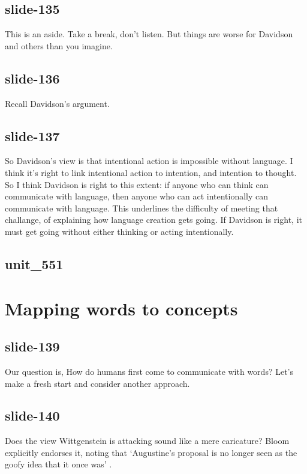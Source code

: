 \documentclass[12pt,\papersize]{extarticle}
\begin{document}
 
\subsection{slide-135}
This is an aside. Take a break, don't listen. But things are worse for Davidson and others than you imagine.
 
 
\subsection{slide-136}
Recall Davidson's argument.
 
 
\subsection{slide-137}
So Davidson's view is that intentional action is impossible without language.
I think it's right to link intentional action to intention, and intention to thought.
So I think Davidson is right to this extent: if anyone who can think can communicate with language, then anyone who can act intentionally can communicate with language.
This underlines the difficulty of meeting that challange, of explaining how language creation gets going.
If Davidson is right, it must get going without either thinking or acting intentionally.
 
 
\subsection{unit\_551}
 
\section{Mapping words to concepts}
 
 
\subsection{slide-139}
Our question is, How do humans first come to communicate with words?
Let's make a fresh start and consider another approach.
 
 
\subsection{slide-140}
Does the view Wittgenstein is attacking sound like a mere caricature? Bloom explicitly endorses it, noting that
‘Augustine’s proposal is no longer seen as the goofy idea that it once was’ \citep[p.\ 61]{Bloom:2000qz}.
 
\end{document}
